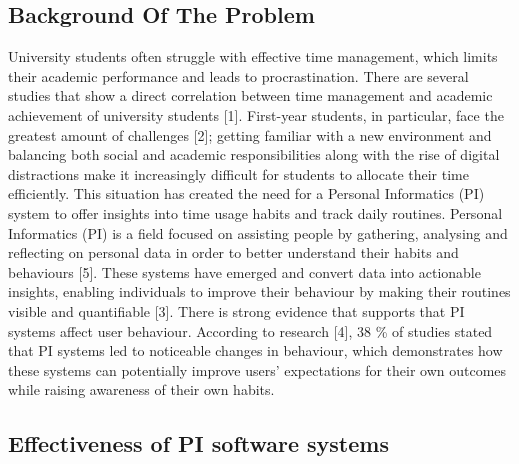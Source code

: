 \documentclass[12pt,a4paper]{article}
\begin{document}
\subsection{Background Of The Problem}
University students often struggle with effective time management, which limits their academic performance and leads to procrastination. There are several studies that show a direct correlation between time management and academic achievement of university students [1]. First-year students, in particular, face the greatest amount of challenges [2]; getting familiar with a new environment and balancing both social and academic responsibilities along with the rise of digital distractions make it increasingly difficult for students to allocate their time efficiently. This situation has created the need for a Personal Informatics (PI) system to offer insights into time usage habits and track daily routines. Personal Informatics (PI) is a field focused on assisting people by gathering, analysing and reflecting on personal data in order to better understand their habits and behaviours [5]. These systems have emerged and convert data into actionable insights, enabling individuals to improve their behaviour by making their routines visible and quantifiable [3]. There is strong evidence that supports that PI systems affect user behaviour. According to research [4], 38 \% of studies stated that PI systems led to noticeable changes in behaviour, which demonstrates how these systems can potentially improve users' expectations for their own outcomes while raising awareness of their own habits.

\subsection{Effectiveness of PI software systems}
\end{document}
